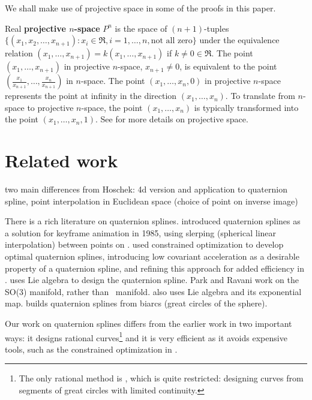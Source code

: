 We shall make use of projective space in some of the proofs in this paper.

\begin{defn2}
\label{defn:projspace}
Real {\bf projective $n$-space} $P^n$ is the space of $(n+1)$-tuples
$\{ (x_1,x_2,\ldots,x_{n+1}) : x_i \in \Re, i=1,\ldots,n, \mbox{not all zero} \}$
under the equivalence relation $(x_1,\ldots,x_{n+1}) = k(x_1,\ldots,x_{n+1})$
if $k \neq 0 \in \Re$.
The point $(x_1,\ldots,x_{n+1})$ in projective $n$-space, $x_{n+1} \neq 0$,
is equivalent to the point $(\frac{x_1}{x_{n+1}},\ldots,\frac{x_n}{x_{n+1}})$
in $n$-space.
The point $(x_1,\ldots,x_n,0)$ in projective $n$-space represents the point
at infinity in the direction $(x_1,\ldots,x_n)$.
To translate from $n$-space to projective $n$-space, the point 
$(x_1,\ldots,x_n)$ is typically transformed into the point $(x_1,\ldots,x_n,1)$.
See \cite{harris92} for more details on projective space.
\end{defn2}

\section{Related work}
\label{sec:prevwork}

two main differences from Hoschek: 
	4d version and application to quaternion spline, 
	point interpolation in Euclidean space (choice of point on inverse image)

There is a rich literature on quaternion splines.
\cite{shoemake85} introduced quaternion splines as a solution
for keyframe animation in 1985, using slerping (spherical linear
interpolation) between points on .
\cite{barr92} used constrained optimization to develop optimal
quaternion splines, introducing low covariant acceleration
as a desirable property of a quaternion spline,
and refining this approach for added efficiency in \cite{rama97}.
\cite{park97} uses Lie algebra to design the quaternion spline.
Park and Ravani work on the SO(3) manifold, rather than \ manifold.
\cite{kim95} also uses Lie algebra and its exponential map.
\cite{wang93} builds quaternion splines from biarcs 
(great circles of the sphere).

Our work on quaternion splines differs from the earlier work
in two important ways: it designs rational curves\footnote{The
	only rational method is \cite{wang93}, which is quite restricted:
	designing curves from segments of great circles
	with limited continuity.}
and it is very efficient as it avoids expensive tools,
such as the constrained optimization in \cite{barr92}.

